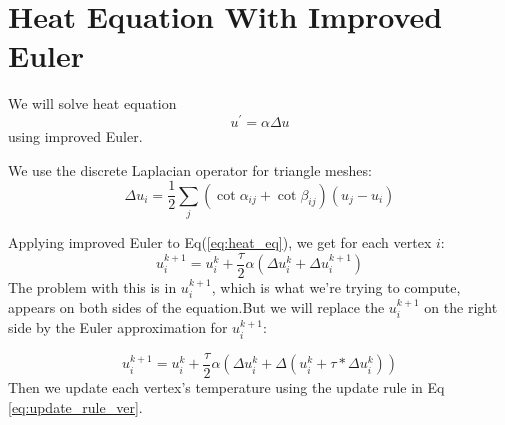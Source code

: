 \documentclass{article}
\begin{document}
\section*{Heat Equation With Improved Euler}
We will solve heat equation 
\begin{equation} \label{eq:heat_eq}
u^{\prime} = \alpha \Delta u
\end{equation}
using improved Euler. 

We use the discrete Laplacian operator for triangle meshes:
\begin{equation} \label{eq:discrete_laplacian_op}
\Delta u_i = \frac{1}{2}\sum_{j} (\cot{\alpha_{ij}} + \cot{\beta_{ij}})(u_j - u_i)
\end{equation}

Applying improved Euler to Eq(\ref{eq:heat_eq}), we get for each vertex $i$:
\begin{equation} \label{eq:update_rule}
u_i^{k+1} = u_i^{k} +  \frac{\tau}{2} \alpha (\Delta u_i^{k} + \Delta u_i^{k+1})
\end{equation}
The  problem with this is in $u_i^{k+1}$, which is what we're trying to compute, appears on both sides of the equation.But we will replace the $u_i^{k+1}$ on the right side by the Euler approximation for $u_i^{k+1}$: 

\begin{equation} \label{eq:update_rule_ver}
	u_i^{k+1} = u_i^{k} +  \frac{\tau}{2} \alpha(\Delta u_i^{k} + \Delta (u_i^{k} + \tau * \Delta u_i^{k}))
\end{equation}
Then we update each vertex's temperature using the update rule in Eq \ref{eq:update_rule_ver}.
%
%
\end{document}
